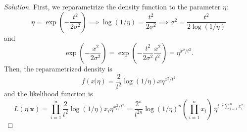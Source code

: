 \begin{proof}[Solution]
    First, we reparametrize the density function to the parameter $\eta$:
    $$
    \eta = \exp\left(-\frac{t^2}{2\sigma^2}\right) \implies \log(1/\eta) = \frac{t^2}{2\sigma^2} \implies \sigma^2 = \frac{t^2}{2\log(1/\eta)}
    $$
    and 
    $$
    \exp\left(-\frac{x^2}{2\sigma^2}\right) = \exp\left(-\frac{t^2}{2\sigma^2}\frac{x^2}{t^2}\right) = \eta^{x^2/t^2}.
    $$
    Then, the reparametrized density is 
    $$f(x|\eta) = \frac{2}{t^2}\log(1/\eta)x\eta^{x^2/t^2}$$
    and the likelihood function is 
    $$
    L(\eta|\boldsymbol{x}) = \prod_{i=1}^n \frac{2}{t^2}\log(1/\eta)x_i\eta^{x_i^2/t^2} = \frac{2^n}{t^{2n}}\log(1/\eta)^n\left(\prod_{i=1}^n x_i\right) \, \eta^{t^{-2}\sum_{i=1}^n x_i^2}
    $$
\end{proof}